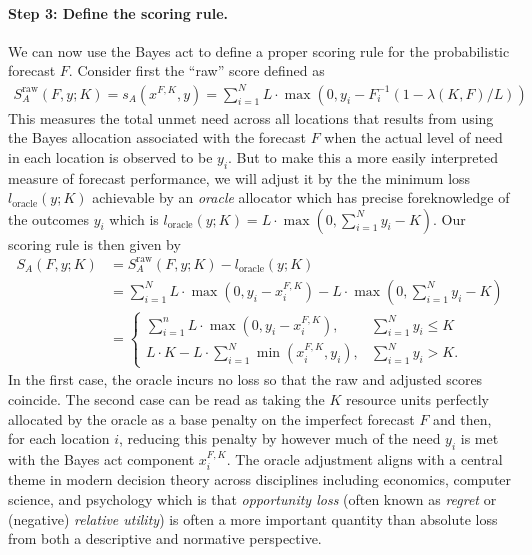 \documentclass{article}\usepackage[]{graphicx}\usepackage[]{xcolor}
\begin{document}


\paragraph{Step 3: Define the scoring rule.} We can now use the Bayes act to define a proper scoring rule for the probabilistic forecast $F$.
Consider first the ``raw'' score defined as
\begin{align}
S_A^{\text{raw}}(F, y; K) = s_A(x^{F,K}, y) = \sum_{i=1}^N L \cdot \max(0, y_i - F_i^{-1}(1- \lambda(K,F)/L))
\end{align}
This measures the total unmet need across all locations that results from using the Bayes allocation associated with the forecast $F$ when the actual level of need in each location is observed to be $y_i$. But to make this a more easily interpreted measure of
forecast performance, we will adjust it by the the minimum loss $l_{\text{oracle}}(y;K)$ achievable by an \emph{oracle} allocator which has precise foreknowledge of the outcomes $y_i$ which is $l_{\text{oracle}}(y;K) = L \cdot \max(0, \sum_{i=1}^{N}y_i - K)$.  Our scoring rule is then given by
\begin{align}
S_A(F, y; K) &= S_A^{\text{raw}}(F, y; K) - l_{\text{oracle}}(y;K) \\
& = \sum_{i=1}^N L  \cdot \max(0, y_i - x_i^{F,K}) - L \cdot  \max(0, \sum_{i=1}^{N}y_i - K) \\
& =
\begin{cases}
\sum_{i=1}^n L  \cdot  \max(0, y_i - x_i^{F,K}), &  \sum_{i=1}^{N}y_i \leq K \\
L \cdot K - L \cdot \sum_{i=1}^{N} \min(x_i^{F,K}, y_i), &  \sum_{i=1}^{N}y_i > K.
\end{cases}
\end{align}
In the first case, the oracle incurs no loss so that the raw and adjusted scores coincide. The second case can be read as taking the $K$ resource units perfectly allocated by the oracle as a base penalty on
the imperfect forecast $F$ and then, for each location $i$, reducing this penalty by however much of the need $y_i$
is met with the Bayes act component $x_i^{F,K}$.
The oracle adjustment aligns with a central theme in modern decision theory across disciplines including economics, computer science, and psychology which is that
\emph{opportunity loss} (often known as \emph{regret} or (negative) \emph{relative utility}) is often a more important quantity than absolute loss from both a descriptive and normative perspective.
\end{document}
